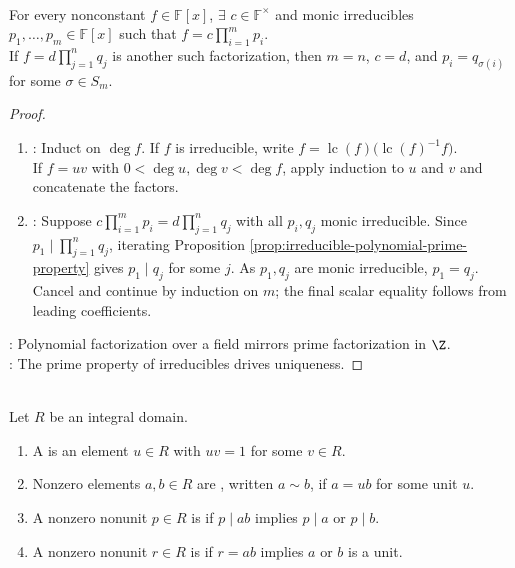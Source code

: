 \begin{theorem} \label{thm:unique-factorization-polynomial-ring-field} \\
For every nonconstant $f\in\mathbb{F}[x]$, $\exists$ $c\in\mathbb{F}^{\times}$ and monic irreducibles $p_1,\ldots,p_m\in\mathbb{F}[x]$ such that $f=c\prod\limits_{i=1}^{m}p_i$.\\
If $f=d\prod\limits_{j=1}^{n}q_j$ is another such factorization, then $m=n$, $c=d$, and $p_i=q_{\sigma(i)}$ for some $\sigma\in S_m$.
\begin{proof}
\begin{enumerate}[label=(\roman*)]
\setlength{\itemsep}{0pt}
\item {}: Induct on $\deg f$. If $f$ is irreducible, write $f=\operatorname{lc}(f)\bigl(\operatorname{lc}(f)^{-1}f\bigr)$.\\
If $f=uv$ with $0<\deg u,\deg v<\deg f$, apply induction to $u$ and $v$ and concatenate the factors.
\item {}: Suppose $c\prod_{i=1}^{m}p_i=d\prod_{j=1}^{n}q_j$ with all $p_i,q_j$ monic irreducible. Since $p_1\mid\prod_{j=1}^{n}q_j$, iterating Proposition \ref{prop:irreducible-polynomial-prime-property} gives $p_1\mid q_j$ for some $j$. As $p_1,q_j$ are monic irreducible, $p_1=q_j$.\\
Cancel and continue by induction on $m$; the final scalar equality follows from leading coefficients.
\end{enumerate}
: Polynomial factorization over a field mirrors prime factorization in $\Z$.\\
: The prime property of irreducibles drives uniqueness.
\end{proof}
\end{theorem}

\begin{definition} \label{def:unit-associate-prime-irreducible-domain} \\
Let $R$ be an integral domain.
\begin{enumerate}[label=(\roman*)]
\setlength{\itemsep}{0pt}
\item A  is an element $u\in R$ with $uv=1$ for some $v\in R$.
\item Nonzero elements $a,b\in R$ are , written $a\sim b$, if $a=ub$ for some unit $u$.
\item A nonzero nonunit $p\in R$ is  if $p\mid ab$ implies $p\mid a$ or $p\mid b$.
\item A nonzero nonunit $r\in R$ is  if $r=ab$ implies $a$ or $b$ is a unit.
\end{enumerate}
\end{definition}

